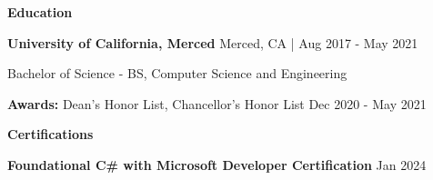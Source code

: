\documentclass[10pt]{article}
\begin{document}
\begin{center}
    \textbf{Education}
    \hrulefill
\end{center}
\textbf{University of California, Merced} \hfill Merced, CA | Aug 2017 - May 2021

Bachelor of Science - BS, Computer Science and Engineering 

\textbf{Awards:} Dean's Honor List, Chancellor's Honor List \hfill Dec 2020 - May 2021

\begin{center}
    \textbf{Certifications}
    \hrulefill
\end{center}
\textbf{Foundational C\# with Microsoft Developer Certification} \hfill Jan 2024
\end{document}
